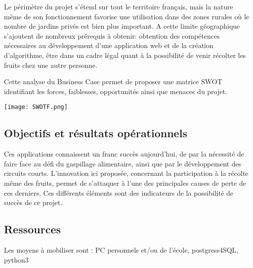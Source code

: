 \documentclass{article}
\begin{document}
Le périmètre du projet s'étend sur tout le territoire français, mais la nature même de son fonctionnement favorise une utilisation dans des zones rurales où le nombre de jardins privés est bien plus important.
A cette limite géographique s'ajoutent de nombreux prérequis à obtenir: obtention des compétences nécessaires au développement d'une application web et de la création d'algorithme, être dans un cadre légal quant à la possibilité de venir récolter les fruits chez une autre personne.

\vspace{4mm}
 
Cette analyse du Business Case permet de proposer une matrice SWOT identifiant les forces, faiblesses, opportunités ainsi que menaces du projet.

\vspace{2mm}             
  
\begin{centering}
\texttt{[image: SWOTF.png]}
\end{centering}

\maketitle
\subsection{Objectifs et résultats opérationnels}

Ces applications connaissent un franc succès aujourd'hui, de par la nécessité de faire face au défi du gaspillage alimentaire, ainsi que par le développement des circuits courts. L'innovation ici proposée, concernant la participation à la récolte même des fruits, permet de s'attaquer à l'une des principales causes de perte de ces derniers. Ces différents éléments sont des indicateurs de la possibilité de succès de ce projet.

\subsection{Ressources}
Les moyens à mobiliser sont :
PC personnels et/ou de l'école, postgress4SQL, python3 
\end{document}
